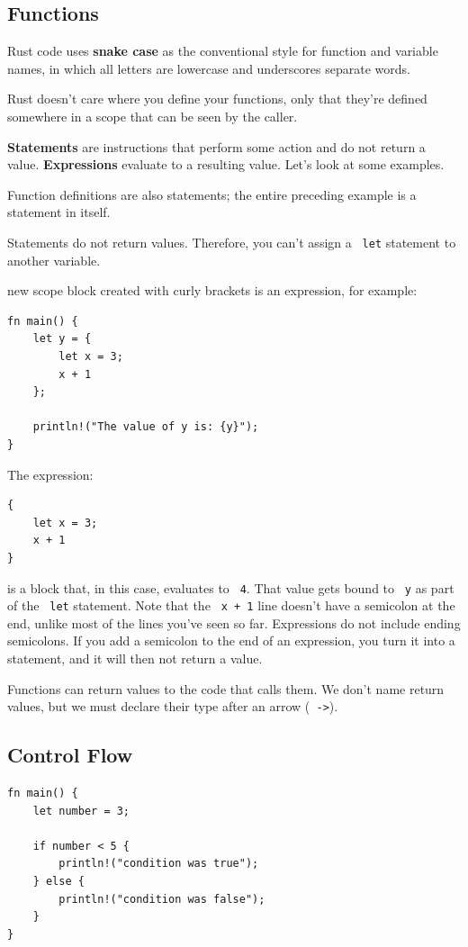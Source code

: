 \documentclass[11pt]{article}
\let\OldTexttt\texttt
\renewcommand{\texttt}[1]{\OldTexttt{\color{MidnightBlue} #1}}
\begin{document}
\subsection{Functions}
\label{sec:org0118dde}
Rust code uses \textbf{snake case} as the conventional style for function and variable names, in which
all letters are lowercase and underscores separate words.

Rust doesn’t care where you define your functions, only that they’re defined somewhere in a
scope that can be seen by the caller.

\textbf{Statements} are instructions that perform some action and do not return a value. \textbf{Expressions}
evaluate to a resulting value. Let’s look at some examples.

Function definitions are also statements; the entire preceding example is a statement in itself.

Statements do not return values. Therefore, you can’t assign a \texttt{let} statement to another variable.

new scope block created with curly brackets is an expression, for example:
\begin{verbatim}
fn main() {
    let y = {
        let x = 3;
        x + 1
    };

    println!("The value of y is: {y}");
}
\end{verbatim}

The expression:
\begin{verbatim}
{
    let x = 3;
    x + 1
}
\end{verbatim}
is a block that, in this case, evaluates to \texttt{4}. That value gets bound to \texttt{y} as part of the \texttt{let}
statement. Note that the \texttt{x + 1} line doesn’t have a semicolon at the end, unlike most of the
lines you’ve seen so far. Expressions do not include ending semicolons. If you add a semicolon
to the end of an expression, you turn it into a statement, and it will then not return a value.

Functions can return values to the code that calls them. We don’t name return values, but we
must declare their type after an arrow (\texttt{->}).
\subsection{Control Flow}
\label{sec:orge101602}
\begin{verbatim}
fn main() {
    let number = 3;

    if number < 5 {
        println!("condition was true");
    } else {
        println!("condition was false");
    }
}
\end{verbatim}
\end{document}
